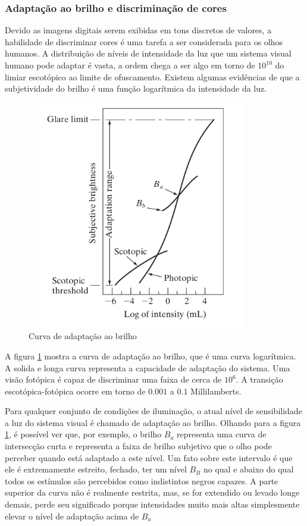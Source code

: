 \documentclass[12pt]{article}
\begin{document}
    \subsubsection{Adaptação ao brilho e discriminação de cores}
    Devido as imagens digitais serem exibidas em tons discretos de valores, a habilidade de discriminar
    cores é uma tarefa a ser considerada para os olhos humanos. A distribuição de níveis de intensidade
    da luz que um sistema visual humano pode adaptar é vasta, a ordem chega a ser algo em torno de
    $10^{10}$ do limiar escotópico ao limite de ofuscamento. Existem algumas evidências de que a subjetividade
    do brilho é uma função logarítmica da intensidade da luz.
    \begin{figure}[h]
        \centering
        \includegraphics[width=10cm,height=10cm]{images/8.png}
        \caption{Curva de adaptação ao brilho}
        \label{fig:exemplo}
    \end{figure}
    A figura \ref{fig:exemplo} mostra a curva de adaptação ao brilho, que é uma curva logarítmica. A
    solida e longa curva representa a capacidade de adaptação do sistema. Uma visão fotópica é
    capaz de discriminar uma faixa de cerca de $10^{6}$. A transição escotópica-fotópica ocorre em
    torno de $0.001$ a $0.1$ Millilamberts.

    Para qualquer conjunto de condições de iluminação, o atual nível de sensibilidade a luz do sistema
    visual é chamado de adaptação ao brilho. Olhando para a figura \ref{fig:exemplo}, é possível ver
    que, por exemplo, o brilho $B_{a}$ representa uma curva de intersecção curta e representa
    a faixa de brilho subjetivo que o olho pode perceber quando está adaptado a este nível.
    Um fato sobre este intervalo é que ele é extremamente estreito, fechado, ter um nível $B_{B}$ no qual e abaixo do qual todos os estímulos são percebidos como indistintos
negros capazes. A parte superior da curva não é realmente restrita, mas, se for extendido ou
levado longe demais, perde seu significado porque intensidades muito mais altas simplesmente
elevar o nível de adaptação acima de $B_{a}$
\end{document}

